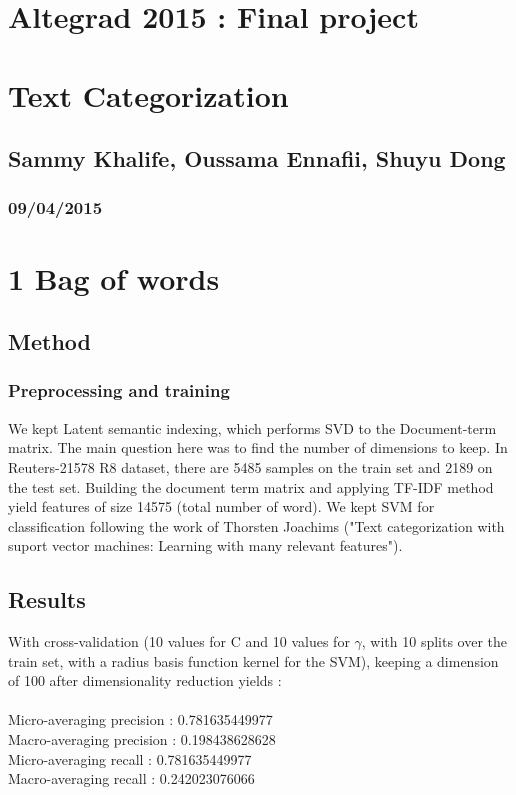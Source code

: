 
\geometry{hmargin=2.5cm,vmargin=2cm}   


\begin{center}

\section*{Altegrad 2015 : Final project}
\section*{Text Categorization}
\subsection*{Sammy Khalife, Oussama Ennafii, Shuyu Dong}
\subsubsection*{09/04/2015}

\end{center}

\section*{1 Bag of words}
\subsection*{Method}
\subsubsection*{Preprocessing and training}
We kept Latent semantic indexing, which performs SVD to the Document-term matrix.
The main question here was to find the number of dimensions to keep. In Reuters-21578 R8 dataset, there are 5485 samples on the train set and 2189 on the test set. Building the document term matrix and applying TF-IDF method yield features of size 14575 (total number of word). 
We kept SVM for classification following the work of Thorsten Joachims ("Text categorization with suport vector machines: Learning with many relevant features").
\subsection*{Results}
With cross-validation (10 values for C and 10 values for $\gamma$, with 10 splits over the train set, with a radius basis function kernel for the SVM), keeping a dimension of 100 after dimensionality reduction yields :~\\
~\\
Micro-averaging precision : 0.781635449977~\\
Macro-averaging precision : 0.198438628628~\\
Micro-averaging recall : 0.781635449977~\\
Macro-averaging recall : 0.242023076066~\\

